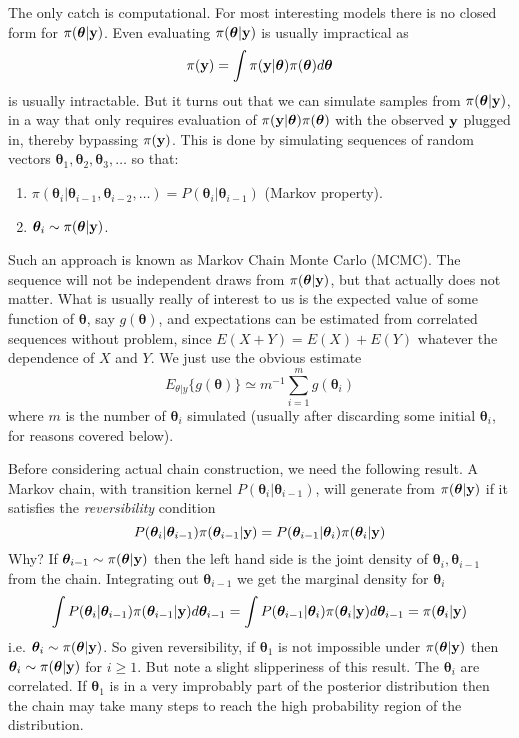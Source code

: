 \documentclass[10pt] {article}
\theoremstyle{definition}
\begin{document}
The only catch is computational. For most interesting models there is no closed form for $\pi( {\bm \theta}|{\bf y})$. Even evaluating $\pi( {\bm \theta}|{\bf y})$ is usually impractical as 
$$
\pi({\bf y}) = \int \pi({\bf y} | {\bm \theta})\pi ({\bm \theta}) d{\bm \theta}
$$
is usually intractable.
But it turns out that we can simulate samples from $\pi( {\bm \theta}|{\bf y})$, in a way that  only requires evaluation of $\pi({\bf y} | {\bm \theta})\pi ({\bm \theta})$ with the observed $\bf y$ plugged in, thereby bypassing $\pi ({\bf y})$. This is done by simulating sequences of random vectors ${\bm \theta}_1, {\bm \theta}_2, {\bm \theta}_3, \ldots $ so that:
\begin{enumerate}
\item $\pi({\bm \theta}_i|{\bm \theta}_{i-1},{\bm \theta}_{i-2},\ldots) = P({\bm \theta}_i|{\bm \theta}_{i-1})$ (Markov property).
\item ${\bm \theta}_i \sim \pi( {\bm \theta}|{\bf y})$.\end{enumerate}
Such an approach is known as Markov Chain Monte Carlo (MCMC). The sequence will not be independent draws from $ \pi( {\bm \theta}|{\bf y})$, but that actually does not matter. What is usually really of interest to us is the expected value of some function of $\bm \theta$, say $g({\bm \theta})$, and expectations can be estimated from correlated sequences without problem, since $E(X+Y) = E(X)+E(Y)$ whatever the dependence of $X $ and $Y$. We just use the obvious estimate
$$
E_{\theta|y}\{g({\bm \theta})\} \simeq m^{-1}\sum_{i=1}^m g({\bm \theta}_i)
$$ 
where $m$ is the number of ${\bm \theta}_i$ simulated (usually after discarding some initial ${\bm \theta}_i$, for reasons covered below). 

Before considering actual chain construction, we need the following result. A Markov chain, with transition kernel $P({\bm \theta}_i|{\bm \theta}_{i-1})$, will generate from $\pi( {\bm \theta}|{\bf y})$ if it satisfies the {\em reversibility} condition
$$
P({\bm \theta}_i|{\bm \theta}_{i-1}) \pi( {\bm \theta}_{i-1}|{\bf y}) = P({\bm \theta}_{i-1}|{\bm \theta}_{i}) \pi( {\bm \theta}_i|{\bf y})
$$
Why? If ${\bm \theta}_{i-1} \sim \pi( {\bm \theta}|{\bf y}) $ then the left hand side is the joint density of ${\bm \theta}_i, {\bm \theta}_{i-1}$ from the chain. Integrating out ${\bm \theta}_{i-1}$ we get the marginal density  for ${\bm \theta}_i$
$$
\int P({\bm \theta}_i|{\bm \theta}_{i-1}) \pi( {\bm \theta}_{i-1}|{\bf y}) d {\bm \theta}_{i-1} = \int P({\bm \theta}_{i-1}|{\bm \theta}_{i}) \pi( {\bm \theta}_i|{\bf y}) d {\bm \theta}_{i-1} = \pi( {\bm \theta}_i|{\bf y})
$$
i.e. ${\bm \theta}_{i} \sim \pi( {\bm \theta}|{\bf y}) $. So given reversibility, if ${\bm \theta}_1$ is not impossible under $\pi( {\bm \theta}|{\bf y})$ then  ${\bm \theta}_{i} \sim \pi( {\bm \theta}|{\bf y})$ for $i \ge 1$. But note a slight slipperiness of this result. The ${\bm \theta}_i$ are correlated. If ${\bm \theta}_1$ is in a very improbably part of the posterior distribution then the chain may take many steps to reach the high probability region of the distribution.
\end{document}
